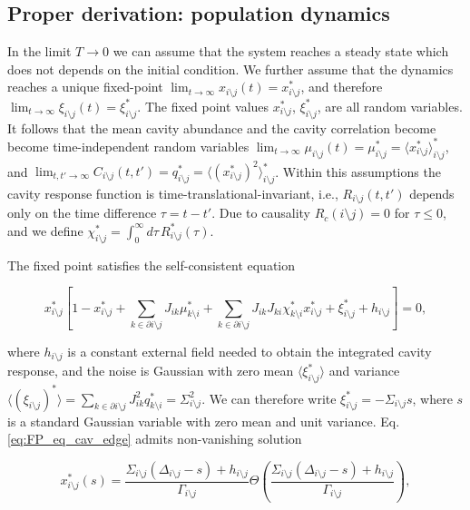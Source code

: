 \documentclass[
    preprint,
    linenumbers,
    amsmath,amssymb,amsfonts,
    aps, physrev,
    superscriptaddress,
    10pt,
    bibnotes
    ]{revtex4-2}
\begin{document}
\subsection{Proper derivation: population dynamics}
In the limit $T\to0$ we can assume that the system reaches a steady
state which does not depends on the initial condition. We further
assume that the dynamics reaches a unique fixed-point
$\lim_{t\to\infty}x_{i\setminus j}(t)=x_{i\setminus j}^{*}$, and therefore $\lim_{t\to\infty}\xi_{i\setminus j}(t)=\xi_{i\setminus j}^{*}$. The fixed point values $x_{i\setminus j}^{*}$,
$\xi_{i\setminus j}^{*}$, are all random variables. It follows that the mean cavity abundance and the cavity correlation
become become time-independent random variables $\lim_{t\to\infty}\mu_{i\setminus j}(t)=\mu_{i\setminus j}^{*}=\langle x_{i\setminus j}^{*}\rangle_{i\setminus j}^{*}$,
and $\lim_{t,t'\to\infty}C_{i\setminus j}(t,t')=q_{i\setminus j}^{*}=\langle ( x_{i\setminus j}^{*})^2\rangle_{i\setminus j}^{*}$.
Within this assumptions the cavity response function is time-translational-invariant,
i.e., $R_{i\setminus j}(t,t')$ depends only on the time difference $\tau=t-t'$.
Due to causality $R_{c}(i\setminus j)=0$ for $\tau\leq 0$, and we define
$\chi_{i\setminus j}^{*}=\int_{0}^{\infty}d\tau\,R_{i\setminus j}^{*}(\tau)$. 

The fixed point satisfies the self-consistent equation 

\begin{equation}
x_{i\setminus j}^{*}\left[1-x_{i\setminus j}^{*}+\sum_{k\in\partial i \setminus j}J_{ik}\mu_{k \setminus i}^{*}+\sum_{k\in\partial i \setminus j}J_{ik}J_{ki}\chi_{k \setminus i}^{*}x_{i \setminus j}^{*}+\xi_{i \setminus j}^{*}+h_{i \setminus j}\right]=0,\label{eq:FP_eq_cav_edge}
\end{equation}

where $h_{i \setminus j}$ is a constant external field needed
to obtain the integrated cavity response, and the noise is Gaussian with zero mean $\langle \xi_{i\setminus j}^*\rangle$ and variance $\langle (\xi_{i\setminus j})^*\rangle=\sum_{k\in\partial i\setminus j}J_{ik}^2q_{k\setminus i}^*=\Sigma_{i\setminus j}^2$. We can therefore write $\xi_{i\setminus j}^*=-\Sigma_{i\setminus j}s$, where $s$ is a standard Gaussian variable with zero mean and unit variance. Eq. \eqref{eq:FP_eq_cav_edge} admits non-vanishing solution

\begin{equation}
x_{i\setminus j}^{*}\left(s\right)=\frac{\Sigma_{i\setminus j}(\Delta_{i\setminus j}-s)+h_{i\setminus j}}{\Gamma_{i\setminus j}}\Theta\left(\frac{\Sigma_{i\setminus j}(\Delta_{i\setminus j}-s)+h_{i\setminus j}}{\Gamma_{i\setminus j}}\right),\label{eq:FP_sol_cavity}
\end{equation}
\end{document}
